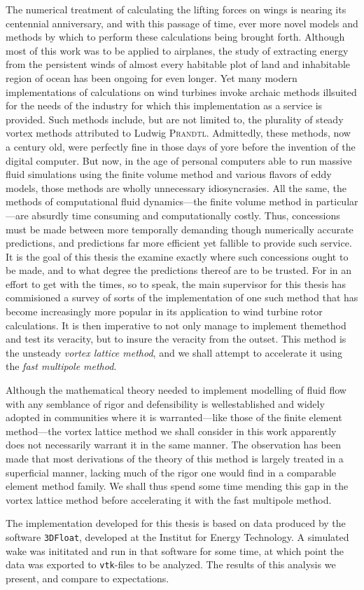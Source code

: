 The numerical treatment of calculating the lifting forces on wings is nearing its centennial anniversary, and with this passage of time, ever more novel models and methods by which to perform these calculations being brought forth.
Although most of this work was to be applied to airplanes, the study of extracting energy from the persistent winds of almost every habitable plot of land and inhabitable region of ocean has been ongoing for even longer.
Yet many modern implementations of calculations on wind turbines invoke archaic methods illsuited for the needs of the industry for which this implementation as a service is provided.
Such methods include, but are not limited to, the plurality of steady vortex methods attributed to Ludwig \textsc{Prandtl}.
Admittedly, these methods, now a century old, were perfectly fine in those days of yore before the invention of the digital computer.
But now, in the age of personal computers able to run massive fluid simulations using the finite volume method and various flavors of eddy models, those methods are wholly unnecessary idiosyncrasies.
All the same, the methods of computational fluid dynamics---the finite volume method in particular---are absurdly time consuming and computationally costly.
Thus, concessions must be made between more temporally demanding though numerically accurate predictions, and predictions far more efficient yet fallible to provide such service.
It is the goal of this thesis the examine exactly where such concessions ought to be made, and to what degree the predictions thereof are to be trusted.
For in an effort to get with the times, so to speak, the main supervisor for this thesis has commisioned a survey of sorts of the implementation of one such method that has become increasingly more popular in its application to wind turbine rotor calculations.
It is then imperative to not only manage to implement themethod and test its veracity, but to insure the veracity from the outset.
This method is the unsteady \emph{vortex lattice method}, and we shall attempt to accelerate it using the \emph{fast multipole method}.

Although the mathematical theory needed to implement modelling of fluid flow with any semblance of rigor and defensibility is wellestablished and widely adopted in communities where it is warranted---like those of the finite element method---the vortex lattice method we shall consider in this work apparently does not necessarily warrant it in the same manner.
The observation has been made that most derivations of the theory of this method is largely treated in a superficial manner, lacking much of the rigor one would find in a comparable element method family.
We shall thus spend some time mending this gap in the vortex lattice method before accelerating it with the fast multipole method.

The implementation developed for this thesis is based on data produced by the software \texttt{3DFloat}, developed at the Institut for Energy Technology.
A simulated wake was inititated and run in that software for some time, at which point the data was exported to \texttt{vtk}-files to be analyzed.
The results of this analysis we present, and compare to expectations.
